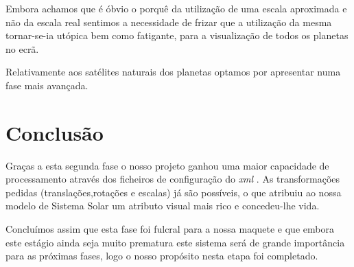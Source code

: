 \documentclass[11pt,a4paper]{report}
\begin{document}
Embora achamos que é óbvio o porquê da utilização de uma escala aproximada e não da escala real sentimos a necessidade de frizar que a utilização da mesma  tornar-se-ia utópica bem como fatigante, para a visualização de todos os planetas no ecrã.

Relativamente aos satélites naturais dos planetas optamos por apresentar numa fase mais avançada.

\chapter{Conclusão}

Graças a esta segunda fase o nosso projeto ganhou uma maior capacidade de processamento através dos ficheiros de configuração do \emph{xml} .
As transformações pedidas (translações,rotações e escalas) já são possíveis,  o que atribuiu ao nossa modelo de Sistema Solar um atributo visual mais rico e concedeu-lhe vida.

Concluímos assim que esta fase foi fulcral para a nossa maquete e que embora este estágio ainda seja muito prematura este sistema será de grande importância para as próximas fases, logo o nosso propósito nesta etapa foi completado.
\end{document}
